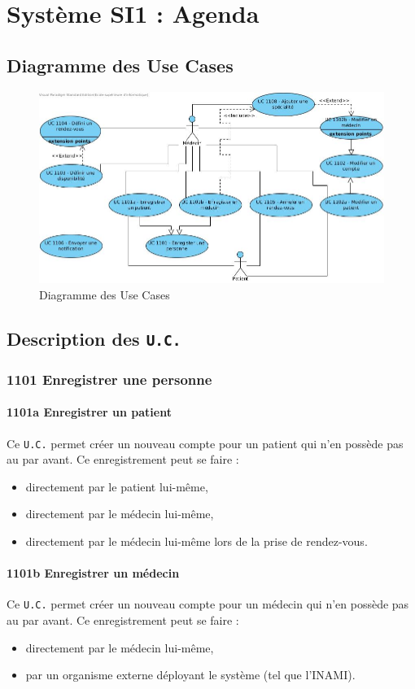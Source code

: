 \documentclass[a4paper, 11pt]{report}
\begin{document}
\section{Système SI1 : Agenda}
\subsection{Diagramme des Use Cases}
\begin{figure}[hb]
	\centering
	\includegraphics[scale=0.5]{SS1_UC.jpg}
	\caption{Diagramme des Use Cases}
	\label{fig:ss1_uc}
\end{figure}
\subsection{Description des \texttt{U.C.}}
\subsubsection{1101 Enregistrer une personne}
\paragraph{1101a Enregistrer un patient}
Ce \texttt{U.C.} permet créer un nouveau compte pour un patient qui n'en possède pas au
par avant. Ce enregistrement peut se faire :
\begin{itemize}
	\item directement par le patient lui-même,
	\item directement par le médecin lui-même,
	\item directement par le médecin lui-même lors de la prise de rendez-vous.
\end{itemize}
\paragraph{1101b Enregistrer un médecin}
Ce \texttt{U.C.} permet créer un nouveau compte pour un médecin qui n'en possède pas au
par avant. Ce enregistrement peut se faire :
\begin{itemize}
	\item directement par le médecin lui-même,
	\item par un organisme externe déployant le système (tel que l'INAMI).
\end{itemize}
\end{document}
